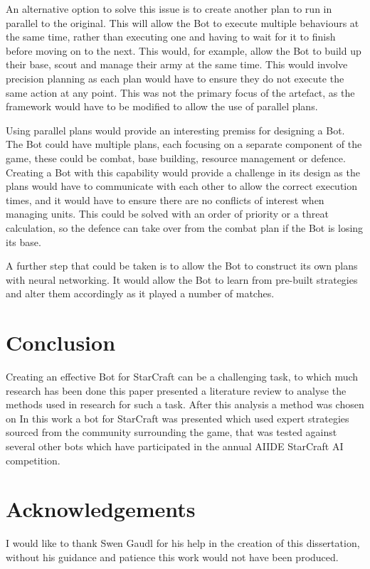 \documentclass[journal]{IEEEtran}
\begin{document}
	An alternative option to solve this issue is to create another plan to run in parallel to the original. This will allow the Bot to execute multiple behaviours at the same time, rather than executing one and having to wait for it to finish before moving on to the next. This would, for example, allow the Bot to build up their base, scout and manage their army at the same time. This would involve precision planning as each plan would have to ensure they do not execute the same action at any point. This was not the primary focus of the artefact, as the framework would have to be modified to allow the use of parallel plans.
	
	Using parallel plans would provide an interesting premiss for designing a Bot. The Bot could have multiple plans, each focusing on a separate component of the game, these could be combat, base building, resource management or defence. Creating a Bot with this capability would provide a challenge in its design as the plans would have to communicate with each other to allow the correct execution times, and it would have to ensure there are no conflicts of interest when managing units. This could be solved with an order of priority or a threat calculation, so the defence can take over from the combat plan if the Bot is losing its base.
	
	A further step that could be taken is to allow the Bot to construct its own plans with neural networking. It would allow the Bot to learn from pre-built strategies and alter them accordingly as it played a number of matches.
	
	\section{Conclusion}
	Creating an effective Bot for StarCraft can be a challenging task, to which much research has been done this paper presented a literature review to analyse the methods used in research for such a task. After this analysis a method was chosen on 
	In this work a bot for StarCraft was presented which used expert strategies sourced from the community surrounding the game, that was tested against several other bots which have participated in the annual AIIDE StarCraft AI competition.
	
	
	
	\section{Acknowledgements}
	I would like to thank Swen Gaudl for his help in the creation of this dissertation, without his guidance and patience this work would not have been produced.
	
\end{document}
